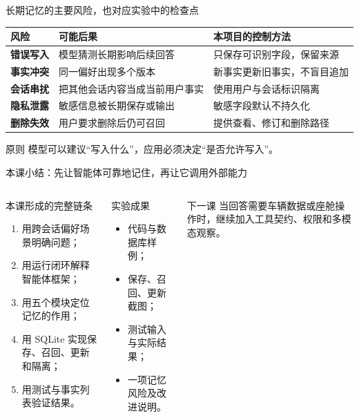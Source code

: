 \begin{frame}{长期记忆的主要风险，也对应实验中的检查点}
  \small
  \begin{tabularx}{\textwidth}{>{\bfseries}p{2.5cm} X X}
    \toprule
    风险 & 可能后果 & 本项目的控制方法 \\
    \midrule
    错误写入 & 模型猜测长期影响后续回答 & 只保存可识别字段，保留来源 \\
    事实冲突 & 同一偏好出现多个版本 & 新事实更新旧事实，不盲目追加 \\
    会话串扰 & 把其他会话内容当成当前用户事实 & 使用用户与会话标识隔离 \\
    隐私泄露 & 敏感信息被长期保存或输出 & 敏感字段默认不持久化 \\
    删除失效 & 用户要求删除后仍可召回 & 提供查看、修订和删除路径 \\
    \bottomrule
  \end{tabularx}
  \begin{alertblock}{原则}
    模型可以建议“写入什么”，应用必须决定“是否允许写入”。
  \end{alertblock}
\end{frame}

\begin{frame}{本课小结：先让智能体可靠地记住，再让它调用外部能力}
  \begin{columns}[T,onlytextwidth]
      \begin{block}{本课形成的完整链条}
        \begin{enumerate}
          \item 用跨会话偏好场景明确问题；
          \item 用运行闭环解释智能体框架；
          \item 用五个模块定位记忆的作用；
          \item 用 SQLite 实现保存、召回、更新和隔离；
          \item 用测试与事实列表验证结果。
        \end{enumerate}
      \end{block}
      \begin{block}{实验成果}
        \begin{itemize}
          \item 代码与数据库样例；
          \item 保存、召回、更新截图；
          \item 测试输入与实际结果；
          \item 一项记忆风险及改进说明。
        \end{itemize}
      \end{block}
      \begin{alertblock}{下一课}
        当回答需要车辆数据或座舱操作时，继续加入工具契约、权限和多模态观察。
      \end{alertblock}
  \end{columns}
\end{frame}


